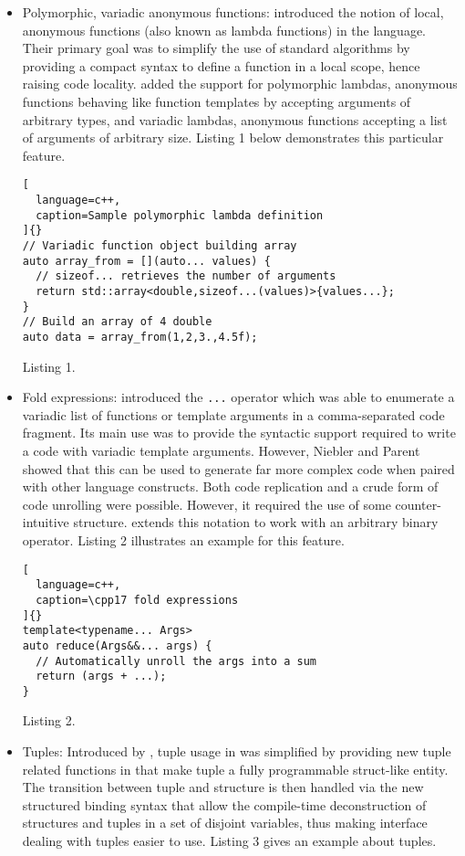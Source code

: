 \documentclass[../../main.tex]{subfiles}
\begin{document}
\begin{itemize}
\item Polymorphic, variadic anonymous functions: 
introduced the notion of local, anonymous functions
(also known as lambda functions) in the language.
Their primary goal was to simplify the use of standard
algorithms by providing a compact syntax to define a
function in a local scope, hence raising code locality.
 added the support for polymorphic lambdas, \ie
anonymous functions behaving like function templates
by accepting arguments of arbitrary types, and variadic
lambdas, \ie anonymous functions accepting a list of
arguments of arbitrary size. Listing 1 below demonstrates
this particular feature.

\begin{lstlisting}[
  language=c++,
  caption=Sample polymorphic lambda definition
]{}
// Variadic function object building array
auto array_from = [](auto... values) {
  // sizeof... retrieves the number of arguments
  return std::array<double,sizeof...(values)>{values...};
}
// Build an array of 4 double
auto data = array_from(1,2,3.,4.5f);
\end{lstlisting}
Listing 1.

\item Fold expressions:  introduced the \lstinline{...} operator
which was able to enumerate a variadic list of functions
or template arguments in a comma-separated code
fragment. Its main use was to provide the syntactic
support required to write a code with variadic template
arguments. However, Niebler and Parent showed that
this can be used to generate far more complex code
when paired with other language constructs. Both
code replication and a crude form of code unrolling
were possible. However, it required the use of some
counter-intuitive structure.  extends this notation
to work with an arbitrary binary operator. Listing 2
illustrates an example for this feature.

\begin{lstlisting}[
  language=c++,
  caption=\cpp17 fold expressions
]{}
template<typename... Args>
auto reduce(Args&&... args) {
  // Automatically unroll the args into a sum
  return (args + ...);
}
\end{lstlisting}
Listing 2.

\item Tuples: Introduced by , tuple usage in \cpp was
simplified by providing new tuple related functions in
 that make tuple a fully programmable struct-like
entity. The transition between tuple and structure is then
handled via the new structured binding syntax that allow
the compile-time deconstruction of structures and tuples
in a set of disjoint variables, thus making interface
dealing with tuples easier to use. Listing 3 gives an
example about tuples.


\end{itemize}
\end{document}

